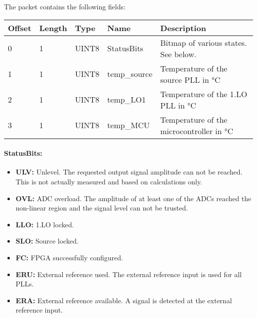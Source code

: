\documentclass[a4paper,11pt]{article}
\newcommand{\bitrect}[2]{
  \begin{pgfonlayer}{foreground}
    \draw [thick] (0,0) rectangle (#1,1);
    \pgfmathsetmacro\result{#1-1}
    \foreach \x in {1,...,\result}
      \draw [thick] (\x,1) -- (\x, 0.8);
  \end{pgfonlayer}
  \bitlabels{#1}{#2}
}
\newcommand{\rwbits}[3]{
  \draw [thick] (#1,0) rectangle ++(#2,1) node[pos=0.5]{#3};
  \pgfmathsetmacro\start{#1+0.5}
  \pgfmathsetmacro\finish{#1+#2-0.5}
}
\newcommand{\robits}[3]{
  \begin{pgfonlayer}{background}
    \draw [thick, fill=lightgray] (#1,0) rectangle ++(#2,1) node[pos=0.5]{#3};
  \end{pgfonlayer}
  \pgfmathsetmacro\start{#1+0.5}
  \pgfmathsetmacro\finish{#1+#2-0.5}
}
\newcommand{\bitlabels}[2]{
  \foreach \bit in {1,...,#1}{
     \pgfmathsetmacro\result{#2}
     \node [above] at (\bit-0.5, 1) {\pgfmathprintnumber{\result}};
   }
}
\begin{document}
The packet contains the following fields:
\begin{ThreePartTable}
\setlength\tabcolsep{3pt}

\begin{longtable}{p{} |  p{}  |  p{}| p{} | p{}}
\toprule
\textbf{Offset} &\textbf{Length} &\textbf{Type} & \textbf{Name} &\textbf{Description} \\ 
\hline
\endhead
\midrule[\heavyrulewidth]
\endfoot  
\midrule[\heavyrulewidth]
\endlastfoot

0 & 1 & UINT8 & StatusBits & Bitmap of various states. See below.\\
1 & 1 & UINT8 & temp\_source & Temperature of the source PLL in \si{\celsius} \\
2 & 1 & UINT8 & temp\_LO1 & Temperature of the 1.LO PLL in \si{\celsius} \\
3 & 1 & UINT8 & temp\_MCU & Temperature of the microcontroller in \si{\celsius} \\
\end{longtable}   
\end{ThreePartTable}

\paragraph{StatusBits:}
\begin{center}
\end{center}
\begin{itemize}
\item \textbf{ULV:} Unlevel. The requested output signal amplitude can not be reached. This is not actually measured and based on calculations only.
\item \textbf{OVL:} ADC overload. The amplitude of at least one of the ADCs reached the non-linear region and the signal level can not be trusted.
\item \textbf{LLO:} 1.LO locked.
\item \textbf{SLO:} Source locked.
\item \textbf{FC:} FPGA successfully configured.
\item \textbf{ERU:} External reference used. The external reference input is used for all PLLs.
\item \textbf{ERA:} External reference available. A signal is detected at the external reference input.
\end{itemize}
\end{document}
